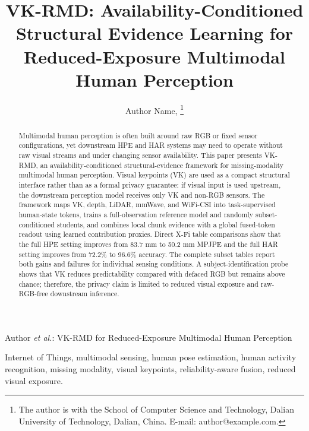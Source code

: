 ﻿\documentclass[journal]{IEEEtran}
\newcommand{\method}{VK-RMD}
\begin{document}
\title{\method: Availability-Conditioned Structural Evidence Learning for Reduced-Exposure Multimodal Human Perception}

\author{Author Name,
\thanks{The author is with the School of Computer Science and Technology, Dalian University of Technology, Dalian, China. E-mail: author@example.com.}
}

{Author \MakeLowercase{\textit{et al.}}: \method{} for Reduced-Exposure Multimodal Human Perception}

\maketitle

\begin{abstract}
Multimodal human perception is often built around raw RGB or fixed sensor configurations, yet downstream HPE and HAR systems may need to operate without raw visual streams and under changing sensor availability. This paper presents \method, an availability-conditioned structural-evidence framework for missing-modality multimodal human perception. Visual keypoints (VK) are used as a compact structural interface rather than as a formal privacy guarantee: if visual input is used upstream, the downstream perception model receives only VK and non-RGB sensors. The framework maps VK, depth, LiDAR, mmWave, and WiFi-CSI into task-supervised human-state tokens, trains a full-observation reference model and randomly subset-conditioned students, and combines local chunk evidence with a global fused-token readout using learned contribution proxies. Direct X-Fi table comparisons show that the full HPE setting improves from 83.7 mm to 50.2 mm MPJPE and the full HAR setting improves from 72.2\% to 96.6\% accuracy. The complete subset tables report both gains and failures for individual sensing conditions. A subject-identification probe shows that VK reduces predictability compared with defaced RGB but remains above chance; therefore, the privacy claim is limited to reduced visual exposure and raw-RGB-free downstream inference.
\end{abstract}

\begin{IEEEkeywords}
Internet of Things, multimodal sensing, human pose estimation, human activity recognition, missing modality, visual keypoints, reliability-aware fusion, reduced visual exposure.
\end{IEEEkeywords}
\end{document}
